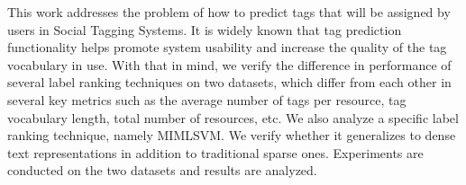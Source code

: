 \begin{foreignabstract}
This work addresses the problem of how to predict tags that will be assigned by users in Social Tagging Systems. It is widely known that tag prediction functionality helps promote system usability and increase the quality of the tag vocabulary in use. With that in mind, we verify the difference in performance of several label ranking techniques on two datasets, which differ from each other in several key metrics such as the average number of tags per resource, tag vocabulary length, total number of resources, etc.  We also analyze a specific label ranking technique, namely MIMLSVM. We verify whether it generalizes to dense text representations in addition to traditional sparse ones. Experiments are conducted on the two datasets and results are analyzed.
\end{foreignabstract}
